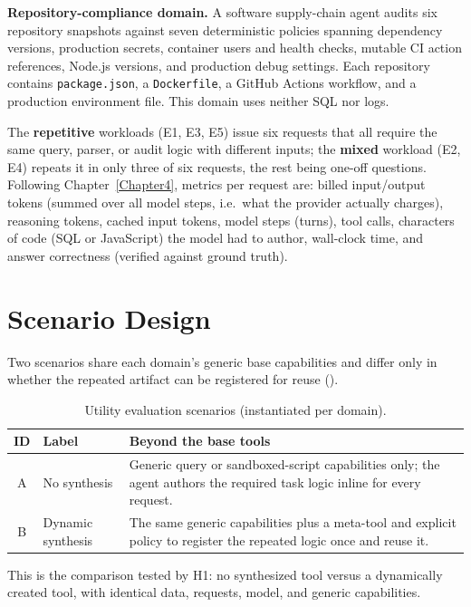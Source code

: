 \noindent\textbf{Repository-compliance domain.} A software supply-chain agent audits
six repository snapshots against seven deterministic policies spanning dependency
versions, production secrets, container users and health checks, mutable CI action
references, Node.js versions, and production debug settings. Each repository contains
\texttt{package.json}, a \texttt{Dockerfile}, a GitHub Actions workflow, and a production
environment file. This domain uses neither SQL nor logs.

The \textbf{repetitive} workloads (E1, E3, E5) issue six requests that all
require the same query, parser, or audit logic with different inputs; the \textbf{mixed} workload
(E2, E4) repeats it in only three of six requests, the rest being one-off questions.
Following Chapter~\ref{Chapter4}, metrics per request are: billed input/output tokens
(summed over all model steps, i.e.\ what the provider actually charges), reasoning
tokens, cached input tokens, model steps (turns), tool calls, characters of code
(SQL or JavaScript) the model had to author, wall-clock time, and answer correctness
(verified against ground truth).

\section{Scenario Design}
Two scenarios share each domain's generic base capabilities and differ only in whether
the repeated artifact can be registered for reuse ().

\begin{table}[htbp]
    \centering
    \caption{Utility evaluation scenarios (instantiated per domain).}
    \label{tab:scenarios}
    \small
    \begin{tabular}{@{}clp{9.5cm}@{}}
        \toprule
        \textbf{ID} & \textbf{Label} & \textbf{Beyond the base tools} \\
        \midrule
        A & No synthesis & Generic query or sandboxed-script capabilities only; the agent authors the required task logic inline for every request. \\
        B & Dynamic synthesis & The same generic capabilities plus a meta-tool and explicit policy to register the repeated logic once and reuse it. \\
        \bottomrule
    \end{tabular}
\end{table}

This is the comparison tested by H1: no synthesized tool versus a dynamically created
tool, with identical data, requests, model, and generic capabilities.

